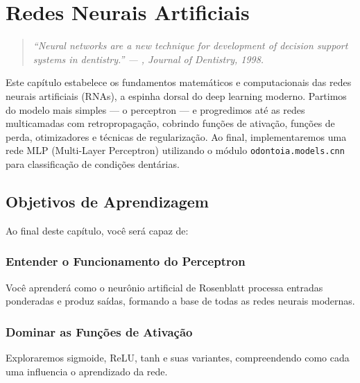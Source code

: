 
\chapter{Redes Neurais Artificiais}
\label{cap:redes-neurais}

\niveltres

\begin{quote}
\itshape\small
``Neural networks are a new technique for development of decision support systems in dentistry.'' --- , Journal of Dentistry, 1998.
\end{quote}

Este capítulo estabelece os fundamentos matemáticos e computacionais das redes neurais
artificiais (RNAs), a espinha dorsal do deep learning moderno. Partimos do modelo mais
simples --- o perceptron --- e progredimos até as redes multicamadas com retropropagação,
cobrindo funções de ativação, funções de perda, otimizadores e técnicas de regularização.
Ao final, implementaremos uma rede MLP (Multi-Layer Perceptron) utilizando o módulo
\texttt{odontoia.models.cnn} para classificação de condições dentárias.


\section{Objetivos de Aprendizagem}

Ao final deste capítulo, você será capaz de:

\subsection{Entender o Funcionamento do Perceptron}
Você aprenderá como o neurônio artificial de Rosenblatt processa entradas ponderadas e produz saídas, formando a base de todas as redes neurais modernas.

\subsection{Dominar as Funções de Ativação}
Exploraremos sigmoide, ReLU, tanh e suas variantes, compreendendo como cada uma influencia o aprendizado da rede.

